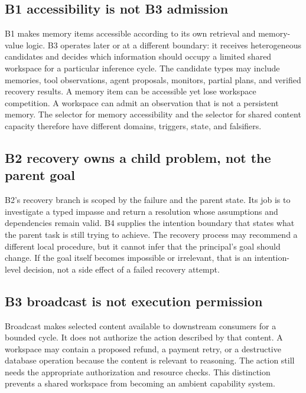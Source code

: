 \subsection{B1 accessibility is not B3 admission}
\label{subsec:ch18-b1-versus-b3}

B1 makes memory items accessible according to its own retrieval and memory-value logic. B3 operates later or at a different boundary: it receives heterogeneous candidates and decides which information should occupy a limited shared workspace for a particular inference cycle. The candidate types may include memories, tool observations, agent proposals, monitors, partial plans, and verified recovery results. A memory item can be accessible yet lose workspace competition. A workspace can admit an observation that is not a persistent memory. The selector for memory accessibility and the selector for shared content capacity therefore have different domains, triggers, state, and falsifiers.

\subsection{B2 recovery owns a child problem, not the parent goal}
\label{subsec:ch18-b2-parent-boundary}

B2's recovery branch is scoped by the failure and the parent state. Its job is to investigate a typed impasse and return a resolution whose assumptions and dependencies remain valid. B4 supplies the intention boundary that states what the parent task is still trying to achieve. The recovery process may recommend a different local procedure, but it cannot infer that the principal's goal should change. If the goal itself becomes impossible or irrelevant, that is an intention-level decision, not a side effect of a failed recovery attempt.

\subsection{B3 broadcast is not execution permission}
\label{subsec:ch18-b3-not-permission}

Broadcast makes selected content available to downstream consumers for a bounded cycle. It does not authorize the action described by that content. A workspace may contain a proposed refund, a payment retry, or a destructive database operation because the content is relevant to reasoning. The action still needs the appropriate authorization and resource checks. This distinction prevents a shared workspace from becoming an ambient capability system.

